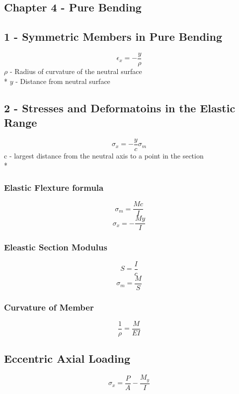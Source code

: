 \documentclass[10pt,landscape]{article}
\begin{document}
\begin{multicols}{3}
\section{Chapter 4 - Pure Bending}
\subsection{1 - Symmetric Members in Pure Bending}
\begin{equation}
    \epsilon_x=-\frac{y}{\rho}
\end{equation}
$\rho$ - Radius of curvature of the neutral surface\\*
$y$ - Distance from neutral surface
\subsection{2 - Stresses and Deformatoins in the Elastic Range}
\begin{equation}
    \sigma_x=-\frac{y}{c}\sigma_m
\end{equation}
c - largest distance from the neutral axis to a point in the section\\*
\subsubsection{Elastic Flexture formula}
\begin{equation}
    \sigma_m=\frac{Mc}{I}
\end{equation}
\begin{equation}
    \sigma_x=-\frac{My}{I}
\end{equation}
\subsubsection{Eleastic Section Modulus}
\begin{equation}
    S=\frac{I}{c}
\end{equation}
\begin{equation}
    \sigma_m=\frac{M}{S}
\end{equation}
\subsubsection{Curvature of Member}
\begin{equation}
    \frac{1}{\rho}=\frac{M}{EI}
\end{equation}
\subsection{Eccentric Axial Loading}
\begin{equation}
    \sigma_x=\frac{P}{A}-\frac{M_y}{I}    
\end{equation}

\end{multicols}
\end{document}
